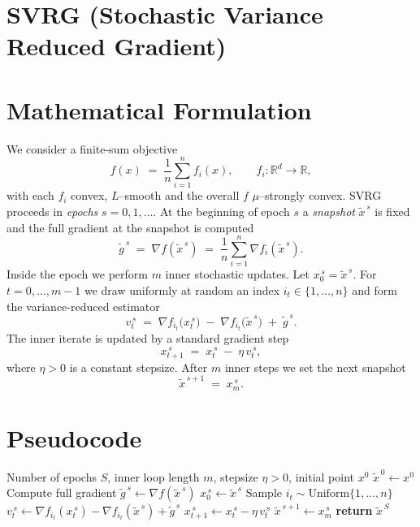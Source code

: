 \documentclass{article}
\begin{document}
\section*{SVRG (Stochastic Variance Reduced Gradient)}

\section*{Mathematical Formulation}
We consider a finite‑sum objective
\[
    f(x)\;=\;\frac{1}{n}\sum_{i=1}^{n} f_i(x),\qquad 
    f_i:\mathbb{R}^d\to\mathbb{R},
\]
with each $f_i$ convex, $L$–smooth and the overall $f$ $\mu$–strongly convex.  
SVRG proceeds in \emph{epochs} $s=0,1,\dots$.  At the beginning of epoch $s$ a \emph{snapshot}
$\tilde{x}^{\,s}$ is fixed and the full gradient at the snapshot is computed
\[
    \tilde{g}^{\,s}\;=\;\nabla f(\tilde{x}^{\,s})
    \;=\;\frac{1}{n}\sum_{i=1}^{n}\nabla f_i(\tilde{x}^{\,s}).
\]
Inside the epoch we perform $m$ inner stochastic updates.  Let $x_0^{\,s}= \tilde{x}^{\,s}$.  For $t=0,\dots,m-1$ we draw uniformly at random an index
$i_t\in\{1,\dots,n\}$ and form the variance‑reduced estimator
\[
    v_t^{\,s}\;=\;\nabla f_{i_t}\!\bigl(x_t^{\,s}\bigr)
               \;-\;\nabla f_{i_t}\!\bigl(\tilde{x}^{\,s}\bigr)
               \;+\;\tilde{g}^{\,s}.
\]
The inner iterate is updated by a standard gradient step
\[
    x_{t+1}^{\,s}\;=\;x_t^{\,s}\;-\;\eta\, v_t^{\,s},
\tag{1}
\]
where $\eta>0$ is a constant stepsize.  After $m$ inner steps we set the next snapshot
\[
    \tilde{x}^{\,s+1}\;=\;x_m^{\,s}.
\tag{2}
\]

\section*{Pseudocode}
\begin{algorithm}[H]
\caption{SVRG}
\begin{algorithmic}[1]
\Require Number of epochs $S$, inner loop length $m$, stepsize $\eta>0$, initial point $x^{0}$
\State $\tilde{x}^{\,0}\gets x^{0}$
    \State Compute full gradient $\tilde{g}^{\,s}\gets \nabla f(\tilde{x}^{\,s})$
    \State $x_0^{\,s}\gets \tilde{x}^{\,s}$
        \State Sample $i_t\sim\text{Uniform}\{1,\dots,n\}$
        \State $v_t^{\,s}\gets \nabla f_{i_t}(x_t^{\,s})-\nabla f_{i_t}(\tilde{x}^{\,s})+\tilde{g}^{\,s}$
        \State $x_{t+1}^{\,s}\gets x_t^{\,s}-\eta\,v_t^{\,s}$ 
    \EndFor
    \State $\tilde{x}^{\,s+1}\gets x_m^{\,s}$ 
\EndFor
\State \textbf{return} $\tilde{x}^{\,S}$
\end{algorithmic}
\end{algorithm}
\end{document}
